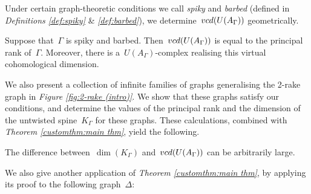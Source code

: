 \documentclass[11pt]{amsart}
\theoremstyle{definition}
\newenvironment{customthm}[1]
  {\renewcommand\theinnercustomthm{#1}\innercustomthm}
  {\endinnercustomthm}
\theoremstyle{definition}
\newenvironment{customcor}[1]
  {\renewcommand\theinnercustomcor{#1}\innercustomcor}
  {\endinnercustomcor}
\theoremstyle{definition}
\theoremstyle{definition}
\newcommand{\uag}{U(A_{\Gamma})} %
\newcommand{\vcduag}{\textsc{vcd}(U(A_{\Gamma}))} %
\newcommand{\spine}{K_{\Gamma}} %
\begin{document}
Under certain graph-theoretic conditions we call \emph{spiky} and \emph{barbed} (defined in \textit{Definitions \ref{def:spiky}} \& \textit{\ref{def:barbed}}), we determine~$\vcduag$ geometrically.

\begin{customthm}{A}[\ref{cor:conditions 1 & 2 + barbed implies vcd = M(L)}]\label{customthm:main thm}
    Suppose that~$\Gamma$ is spiky and barbed. Then~$\vcduag$ is equal to the principal rank of~$\Gamma$. Moreover, there is a~$\uag$-complex realising this virtual cohomological dimension.
\end{customthm}

We also present a collection of infinite families of graphs generalising the 2-rake graph in \emph{Figure \ref{fig:2-rake (intro)}}. We show that these graphs satisfy our conditions, and determine the values of the principal rank and the dimension of the untwisted spine~$\spine$ for these graphs. These calculations, combined with \emph{Theorem \ref{customthm:main thm}}, yield the following.

\begin{customcor}{B}[\ref{cor:arbitrarily large gaps}]\label{customcor:arbitrary gaps}
    The difference between~$\dim(\spine)$ and~$\vcduag$ can be arbitrarily large.
\end{customcor}

We also give another application of \emph{Theorem \ref{customthm:main thm}}, by applying its proof to the following graph~$\Delta$:
\end{document}
